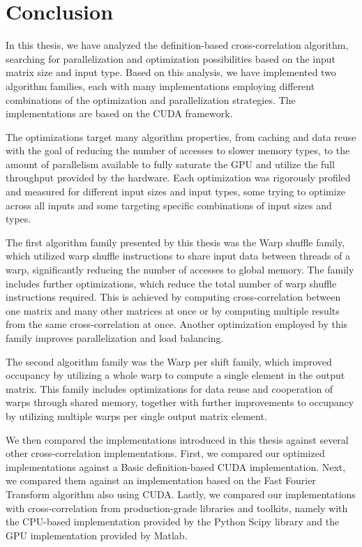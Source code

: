\chapter*{Conclusion}
 
In this thesis, we have analyzed the definition-based cross-correlation algorithm, searching for parallelization and optimization possibilities based on the input matrix size and input type. Based on this analysis, we have implemented two algorithm families, each with many implementations employing different combinations of the optimization and parallelization strategies. The implementations are based on the CUDA framework.

The optimizations target many algorithm properties, from caching and data reuse with the goal of reducing the number of accesses to slower memory types, to the amount of parallelism available to fully saturate the GPU and utilize the full throughput provided by the hardware. Each optimization was rigorously profiled and measured for different input sizes and input types, some trying to optimize across all inputs and some targeting specific combinations of input sizes and types. 

The first algorithm family presented by this thesis was the Warp shuffle family, which utilized warp shuffle instructions to share input data between threads of a warp, significantly reducing the number of accesses to global memory. The family includes further optimizations, which reduce the total number of warp shuffle instructions required. This is achieved by computing cross-correlation between one matrix and many other matrices at once or by computing multiple results from the same cross-correlation at once. Another optimization employed by this family improves parallelization and load balancing.
 
The second algorithm family was the Warp per shift family, which improved occupancy by utilizing a whole warp to compute a single element in the output matrix. This family includes optimizations for data reuse and cooperation of warps through shared memory, together with further improvements to occupancy by utilizing multiple warps per single output matrix element.

We then compared the implementations introduced in this thesis against several other cross-correlation implementations. First, we compared our optimized implementations against a Basic definition-based CUDA implementation. Next, we compared them against an implementation based on the Fast Fourier Transform algorithm also using CUDA. Lastly, we compared our implementations with cross-correlation from production-grade libraries and toolkits, namely with the CPU-based implementation provided by the Python Scipy library and the GPU implementation provided by Matlab. 


